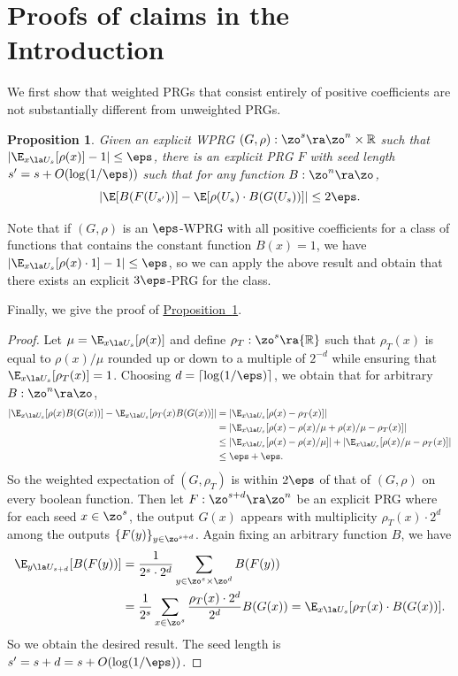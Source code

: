 \documentclass[11pt]{article}
\newcommand{\expref}[2]{\texorpdfstring{\hyperref[#2]{#1~\ref{#2}}}{#1~\ref{#2}}}
\newtheorem{proposition}[theorem]{Proposition}
\newcommand{\R}{{\mathbb R}}
\begin{document}
\section{Proofs of claims in the Introduction}\label{app:intro} %
We first show that weighted PRGs that consist entirely of positive coefficients are not substantially different %
from
%
unweighted PRGs.
\begin{proposition}\label{app:prop:unweight}
    Given an explicit WPRG $(G,\rho):\zo^s\ra\zo^n\times \R$
    such that $|\E_{x\la U_s}[\rho(x)]-1|\leq  \eps$, there is an explicit PRG $F$ with seed length $s'=s+O(\log(1/\eps))$ such that for any function $B:\zo^n\ra\zo$, \[|\E[B(F(U_{s'}))] - \E[\rho(U_s)\cdot B(G(U_s))] |\leq 2\eps.\]
\end{proposition}
Note that if $(G,\rho)$ is an $\eps$-WPRG with all positive coefficients for a class of functions that contains the constant function $B(x)=1$, we have $|\E_{x\la U_s}[\rho(x)\cdot 1]-1|\leq\eps$, so we can apply the above result and obtain that there exists an explicit $3\eps$-PRG for the class.

Finally, we give the proof of \expref{Proposition}{app:prop:unweight}.
\begin{proof}
    Let $\mu=\E_{x\la U_s}[\rho(x)]$ and define $\rho_T:\zo^s\ra\R$ such that $\rho_T(x)$ is equal to $\rho(x)/\mu$ rounded up or down to a multiple of $2^{-d}$ while ensuring that $\E_{x\la U_s}[\rho_T(x)]=1$. Choosing $d=\lceil\log(1/\eps)\rceil$, we obtain that for arbitrary $B:\zo^n\ra\zo$,
    \begin{align*}
        \left|\E_{x\la U_s}[\rho(x)B(G(x))] -\E_{x\la U_s}[\rho_T(x)B(G(x))]\right|  &= \left|\E_{x\la U_s}[\rho(x) - \rho_T(x)]\right|\\
        &= \left|\E_{x\la U_s}[\rho(x) -\rho(x)/\mu+\rho(x)/\mu- \rho_T(x)] \right|\\
        &\leq \left|\E_{x\la U_s}[\rho(x) -\rho(x)/\mu]\right|+\left|\E_{x\la U_s}[\rho(x)/\mu- \rho_T(x)] \right|\\
        &\leq \eps+\eps.
    \end{align*}
    So the weighted expectation of $(G,\rho_T)$ is within $2\eps$ of that of $(G,\rho)$ on every boolean function. Then let $F:\zo^{s+d}\ra\zo^n$ be an explicit PRG where for each seed $x\in \zo^s$, the output $G(x)$ appears with multiplicity $\rho_T(x)\cdot 2^d$ among the outputs $\{F(y)\}_{y\in \zo^{s+d}}$. Again fixing an arbitrary function $B$, we have
%
%
\begin{align*}
 \E_{y\la U_{s+d}}[B(F(y))] &= \frac{1}{2^s\cdot 2^d}\sum_{y\in \zo^s\times\zo^d}B(F(y))\\
 &=\frac{1}{2^s}\sum_{x\in \zo^s}\frac{\rho_T(x)\cdot 2^d}{2^d}B(G(x))
        =\E_{x\la U_s}[\rho_T(x)\cdot B(G(x))].
\end{align*}
    So we obtain the desired result. The seed length is $s'=s+d=s+O(\log(1/\eps))$.
\end{proof}
\end{document}
